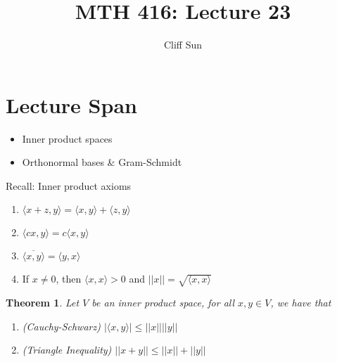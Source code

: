 \documentclass{article}
\title{MTH 416: Lecture 23}
\author{Cliff Sun}
\newtheorem{theorem}{Theorem}[section]
\newtheorem{one minute paper}[theorem]{One Minute Paper}
\begin{document}
\maketitle

\section*{Lecture Span}
\begin{itemize}
    \item Inner product spaces
    \item Orthonormal bases \& Gram-Schmidt
\end{itemize}

Recall: Inner product axioms
\begin{enumerate}
    \item $\langle x + z, y \rangle = \langle x,y \rangle + \langle z,y \rangle$
    \item $\langle cx,y \rangle = c\langle x,y \rangle$
    \item $\overline{\langle x,y \rangle} = \langle y,x \rangle$
    \item If $x \neq 0$, then $\langle x,x \rangle > 0$ and $||x|| = \sqrt{\langle x,x \rangle}$ 
\end{enumerate}

\begin{theorem}
    Let $V$ be an inner product space, for all $x,y \in V$, we have that 
    \begin{enumerate}
        \item (Cauchy-Schwarz) $|\langle x,y \rangle| \leq ||x||||y||$
        \item (Triangle Inequality) $||x + y|| \leq ||x|| + ||y||$
    \end{enumerate}
\end{theorem}
\end{document}
